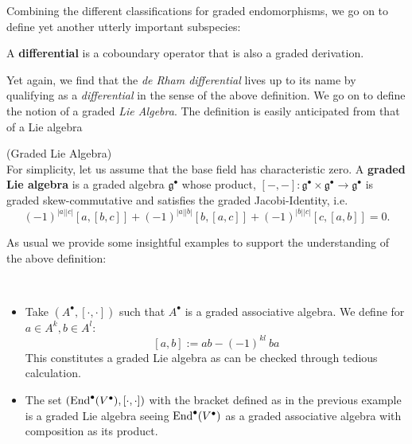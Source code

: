 Combining the different classifications for graded endomorphisms, we go on to define yet another utterly important subspecies:

\begin{definition}
  A \textbf{differential} is a coboundary operator that is also a graded derivation.
\end{definition}


Yet again, we find that the \emph{de Rham differential} lives up to its name by qualifying as a \emph{differential} in the sense of the above definition. We go on to define the notion of a graded \emph{Lie Algebra}. The definition is easily anticipated from that of a Lie algebra

\begin{definition} (Graded Lie Algebra)\\
  For simplicity, let us assume that the base field has characteristic zero. A \textbf{graded Lie algebra} is a graded algebra $\mathfrak{g}^\bullet$ whose product, $[-,-]\colon \mathfrak{g}^\bullet\times\mathfrak{g}^\bullet\rightarrow\mathfrak{g}^\bullet$ is graded skew-commutative and satisfies the graded Jacobi-Identity, i.e.
  $$
  (-1)^{|a||c|}[a,[b,c]]+(-1)^{|a||b|}[b,[a,c]]+(-1)^{|b||c|}[c,[a,b]]=0.
  $$
\end{definition}

As usual we provide some insightful examples to support the understanding of the above definition:

\begin{example}~
\begin{itemize}
  \item Take $(A^\bullet, [\cdot , \cdot ])$ such that $A^\bullet$ is a graded associative algebra. We define for $a \in A^k,b \in A^l$:
  $$ [a,b] := ab-(-1)^{kl} \ ba$$ This constitutes a graded Lie algebra as can be checked through tedious calculation.

  \item The set $(\operatorname{End}^\bullet(V^\bullet), [\cdot,\cdot])$ with the bracket defined as in the previous example is a graded Lie algebra seeing $\operatorname{End}^\bullet(V^\bullet)$ as a graded associative algebra with composition as its product.
\end{itemize}
\end{example}

